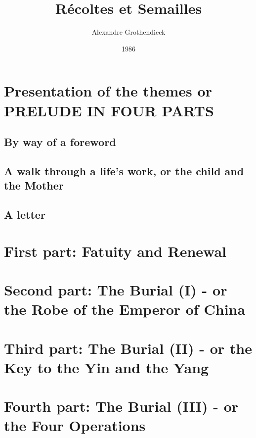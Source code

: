 \documentclass{book}
\begin{document}
\title{R\'ecoltes et Semailles}
\author{Alexandre Grothendieck}
\date{1986}
\maketitle
\tableofcontents

\part*{Presentation of the themes or PRELUDE IN FOUR PARTS}

\chapter{By way of a foreword}


\chapter{A walk through a life's work, or the child and the Mother}




\chapter{A letter}


\part{First part: Fatuity and Renewal}

\part{Second part: The Burial (I) - or the Robe of the Emperor of China}
\label{part:II}

\part{Third part: The Burial (II) - or the Key to the Yin and the Yang}

\part{Fourth part: The Burial (III) - or the Four Operations}



\end{document}
